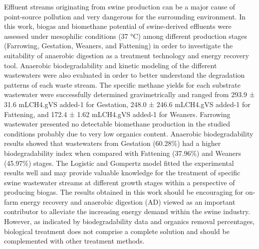 Effluent streams originating from swine production can be a major cause of point-source pollution and very dangerous for the surrounding environment. In this work, biogas and biomethane potential of swine-derived effluents were assessed under mesophilic conditions (37 °C) among different production stages (Farrowing, Gestation, Weaners, and Fattening) in order to investigate the suitability of anaerobic digestion as a treatment technology and energy recovery tool. Anaerobic biodegradability and kinetic modeling of the different wastewaters were also evaluated in order to better understand the degradation patterns of each waste stream. The specific methane yields for each substrate wastewater were successfully determined gravimetrically and ranged from 293.9 ± 31.6 mLCH4.gVS added-1 for Gestation, 248.0 ± 246.6 mLCH4.gVS added-1 for Fattening, and 172.4 ± 1.62 mLCH4.gVS added-1 for Weaners. Farrowing wastewater presented no detectable biomethane production in the studied conditions probably due to very low organics content.  Anaerobic biodegradability results showed that wastewaters from Gestation (60.28\%) had a higher biodegradability index when compared with Fattening (37.96\%) and Weaners (45.97\%) stages. The Logistic and Gompertz model fitted the experimental results well and may provide valuable knowledge for the treatment of specific swine wastewater streams at different growth stages within a perspective of producing biogas. The results obtained in this work should be encouraging for on-farm energy recovery and anaerobic digestion (AD) viewed as an important contributor to alleviate the increasing energy demand within the swine industry. However, as indicated by biodegradability data and organics removal percentages, biological treatment does not comprise a complete solution and should be complemented with other treatment methods.